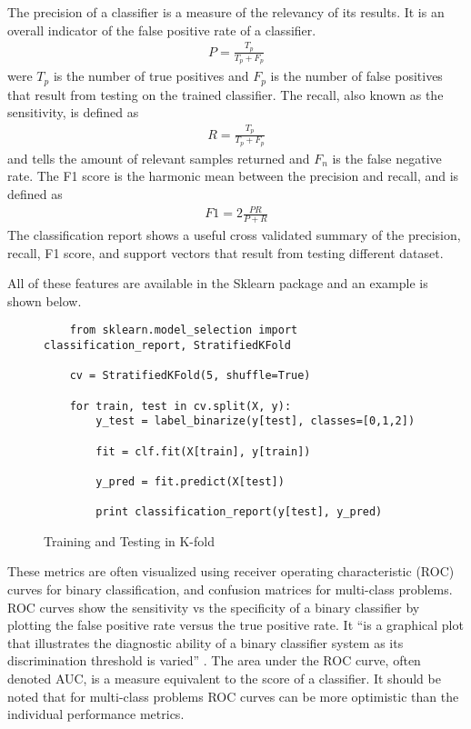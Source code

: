 The precision of a classifier is a measure of the relevancy of its results.  It is an overall indicator of the false positive rate of a classifier.
%
\begin{align}
    P = \frac{T_p}{T_p + F_p}
\end{align}
%
were $T_p$ is the number of true positives and $F_p$ is the number of false positives that result from testing on the trained classifier.  The recall, also known as the sensitivity, is defined as
%
\begin{align}
    R = \frac{T_p}{T_p + F_p}
\end{align}
%
and tells the amount of relevant samples returned and $F_n$ is the false negative rate.  The F1 score is the harmonic mean between the precision and recall, and is defined as
%
\begin{align}
    F1 = 2\frac{PR}{P + R}
\end{align}
%
The classification report shows a useful cross validated summary of the precision, recall, F1 score, and support vectors that result from testing different dataset.

All of these features are available in the Sklearn package and an example is shown below.
%

%
\begin{figure}
    \begin{lstlisting}
    from sklearn.model_selection import classification_report, StratifiedKFold

    cv = StratifiedKFold(5, shuffle=True)

    for train, test in cv.split(X, y):
        y_test = label_binarize(y[test], classes=[0,1,2])

        fit = clf.fit(X[train], y[train])

        y_pred = fit.predict(X[test])

        print classification_report(y[test], y_pred)
    \end{lstlisting}
    \caption{Training and Testing in K-fold}
    \label{fig:scattering}
\end{figure}
These metrics are often visualized using receiver operating characteristic (ROC) curves for binary classification, and confusion matrices for multi-class problems.  ROC curves show the sensitivity vs the specificity of a binary classifier by plotting the false positive rate versus the true positive rate.  It “is a graphical plot that illustrates the diagnostic ability of a binary classifier system as its discrimination threshold is varied” \cite{wikiroc}. The area under the ROC curve, often denoted AUC, is a measure equivalent to the score of a classifier. It should be noted that for multi-class problems ROC curves can be more optimistic than the individual performance metrics.

